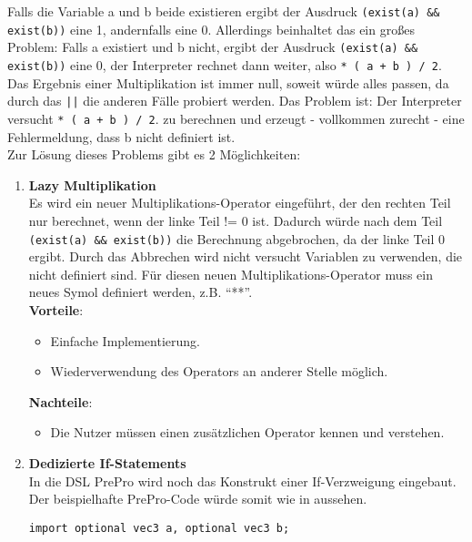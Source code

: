 Falls die Variable a und b beide existieren ergibt der Ausdruck \texttt{(exist(a) \&\& exist(b))} eine 1, andernfalls eine 0.
Allerdings beinhaltet das  ein großes Problem:
Falls a existiert und b nicht, ergibt der Ausdruck \texttt{(exist(a) \&\& exist(b))} eine 0, der Interpreter rechnet dann weiter, also \texttt{* ( a + b ) / 2}.
Das Ergebnis einer Multiplikation ist immer null, soweit würde alles passen, da durch das \texttt{||} die anderen Fälle probiert werden.
Das Problem ist:
Der Interpreter versucht \texttt{* ( a + b ) / 2}. zu berechnen und erzeugt - vollkommen zurecht - eine Fehlermeldung, dass b nicht definiert ist.\\
Zur Lösung dieses Problems gibt es 2 Möglichkeiten:
\begin{enumerate}
\item \textbf{Lazy Multiplikation}\\
Es wird ein neuer Multiplikations-Operator eingeführt, der den rechten Teil nur berechnet, wenn der linke Teil != 0 ist.
Dadurch würde nach dem Teil \texttt{(exist(a) \&\& exist(b))} die Berechnung abgebrochen, da der linke Teil 0 ergibt.
Durch das Abbrechen wird nicht versucht Variablen zu verwenden, die nicht definiert sind.
Für diesen neuen Multiplikations-Operator muss ein neues Symol definiert werden, z.B. ``**''.\\
\textbf{Vorteile}:
\begin{itemize}
\item Einfache Implementierung.
\item Wiederverwendung des Operators an anderer Stelle möglich.
\end{itemize}
\textbf{Nachteile}:
\begin{itemize}
\item Die Nutzer müssen einen zusätzlichen Operator kennen und verstehen.
\end{itemize}

\item \textbf{Dedizierte If-Statements}\\
In die \ac{DSL} PrePro wird noch das Konstrukt einer If-Verzweigung eingebaut.
Der beispielhafte PrePro-Code würde somit wie in  aussehen.
\begin{lstlisting}[language=prepro, label={lst:OptionalImportExample_If}, caption={PrePro-Code mit If-Statements und der exists-Funktion}, captionpos=b]
import optional vec3 a, optional vec3 b;


\end{lstlisting}
\end{enumerate}
